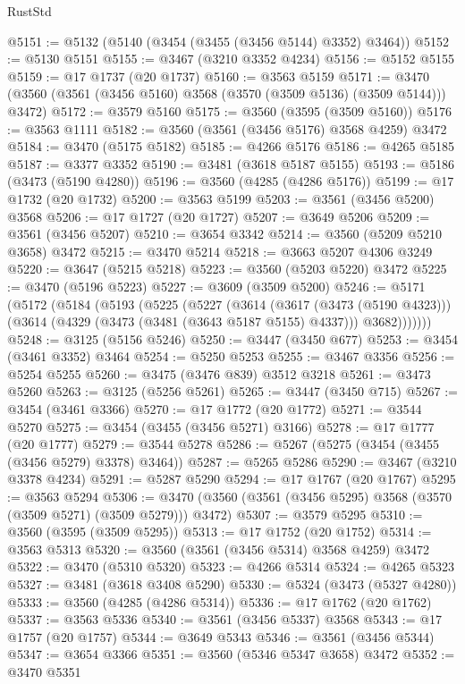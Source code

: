 \begin{lexlean}{RustStd}
\begin{coremodule}
@5151 := @5132 (@5140 (@3454 (@3455 (@3456 @5144) @3352) @3464))
@5152 := @5130 @5151
@5155 := @3467 (@3210 @3352 @4234)
@5156 := @5152 @5155
@5159 := @17 @1737 (@20 @1737)
@5160 := @3563 @5159
@5171 := @3470 (@3560 (@3561 (@3456 @5160) @3568 (@3570 (@3509 @5136) (@3509 @5144))) @3472)
@5172 := @3579 @5160
@5175 := @3560 (@3595 (@3509 @5160))
@5176 := @3563 @1111
@5182 := @3560 (@3561 (@3456 @5176) @3568 @4259) @3472
@5184 := @3470 (@5175 @5182)
@5185 := @4266 @5176
@5186 := @4265 @5185
@5187 := @3377 @3352
@5190 := @3481 (@3618 @5187 @5155)
@5193 := @5186 (@3473 (@5190 @4280))
@5196 := @3560 (@4285 (@4286 @5176))
@5199 := @17 @1732 (@20 @1732)
@5200 := @3563 @5199
@5203 := @3561 (@3456 @5200) @3568
@5206 := @17 @1727 (@20 @1727)
@5207 := @3649 @5206
@5209 := @3561 (@3456 @5207)
@5210 := @3654 @3342
@5214 := @3560 (@5209 @5210 @3658) @3472
@5215 := @3470 @5214
@5218 := @3663 @5207 @4306 @3249
@5220 := @3647 (@5215 @5218)
@5223 := @3560 (@5203 @5220) @3472
@5225 := @3470 (@5196 @5223)
@5227 := @3609 (@3509 @5200)
@5246 := @5171
    (@5172
      (@5184
        (@5193
          (@5225
            (@5227
              (@3614
                (@3617 (@3473 (@5190 @4323)))
                (@3614 (@4329 (@3473 (@3481 (@3643 @5187 @5155) @4337))) @3682)))))))
@5248 := @3125 (@5156 @5246)
@5250 := @3447 (@3450 @677)
@5253 := @3454 (@3461 @3352) @3464
@5254 := @5250 @5253
@5255 := @3467 @3356
@5256 := @5254 @5255
@5260 := @3475 (@3476 @839) @3512 @3218
@5261 := @3473 @5260
@5263 := @3125 (@5256 @5261)
@5265 := @3447 (@3450 @715)
@5267 := @3454 (@3461 @3366)
@5270 := @17 @1772 (@20 @1772)
@5271 := @3544 @5270
@5275 := @3454 (@3455 (@3456 @5271) @3166)
@5278 := @17 @1777 (@20 @1777)
@5279 := @3544 @5278
@5286 := @5267 (@5275 (@3454 (@3455 (@3456 @5279) @3378) @3464))
@5287 := @5265 @5286
@5290 := @3467 (@3210 @3378 @4234)
@5291 := @5287 @5290
@5294 := @17 @1767 (@20 @1767)
@5295 := @3563 @5294
@5306 := @3470 (@3560 (@3561 (@3456 @5295) @3568 (@3570 (@3509 @5271) (@3509 @5279))) @3472)
@5307 := @3579 @5295
@5310 := @3560 (@3595 (@3509 @5295))
@5313 := @17 @1752 (@20 @1752)
@5314 := @3563 @5313
@5320 := @3560 (@3561 (@3456 @5314) @3568 @4259) @3472
@5322 := @3470 (@5310 @5320)
@5323 := @4266 @5314
@5324 := @4265 @5323
@5327 := @3481 (@3618 @3408 @5290)
@5330 := @5324 (@3473 (@5327 @4280))
@5333 := @3560 (@4285 (@4286 @5314))
@5336 := @17 @1762 (@20 @1762)
@5337 := @3563 @5336
@5340 := @3561 (@3456 @5337) @3568
@5343 := @17 @1757 (@20 @1757)
@5344 := @3649 @5343
@5346 := @3561 (@3456 @5344)
@5347 := @3654 @3366
@5351 := @3560 (@5346 @5347 @3658) @3472
@5352 := @3470 @5351

\end{coremodule}
\end{lexlean}
